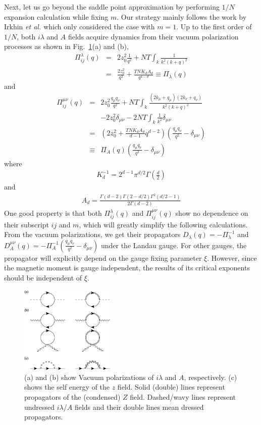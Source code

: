 \documentclass[aps,twocolumn,superscriptaddress]{revtex4-1}
\newcommand{\bea}{\begin{eqnarray}}
\newcommand{\eea}{\end{eqnarray}}
\newcommand{\etal}{\textit{et al.{ }}}
\begin{document}
Next, let us go
beyond the saddle point approximation by performing $1/N$ expansion calculation while fixing $m$. Our strategy mainly follows the work by
Irkhin \etal \cite{irkhin1996} which only considered the case with $m=1$. Up to the first order of $1/N$, both
$i\lambda$ and $A$ fields acquire dynamics from their vacuum polarization processes as shown in Fig.~\ref{fig:self}(a) and (b),
\bea \Pi_{ij}^\lambda(q)&=&2z_0^2\frac{1}{q^2} + NT\int_k \frac{1}{k^2(k+q)^2} \nonumber\\
                        &=&\frac{2z_0^2}{q^2}+\frac{TNK_dA_d}{q^{4-d}} \equiv \Pi_\lambda(q) \eea and \bea
\Pi_{ij}^{\mu\nu}(q) &=& 2z_0^2 \frac{q_\mu q_\nu}{q^2} + NT\int_k \frac{(2k_\mu+q_\mu)(2k_\nu+q_\nu)}{k^2(k+q)^2}
\nonumber\\ && - 2z_0^2 \delta_{\mu\nu} -2NT\int_k \frac{1}{k^2}\delta_{\mu\nu}  \nonumber\\
            &=&\left(2z_0^2+\frac{TNK_dA_d}{d-1} q^{d-2}\right)\left(\frac{q_\mu q_\nu}{q^2}-\delta_{\mu\nu}\right)
\nonumber\\ &\equiv& \Pi_A(q)\left(\frac{q_\mu q_\nu}{q^2}-\delta_{\mu\nu}\right) \eea where \bea
K_d^{-1}=2^{d-1}\pi^{d/2}\Gamma\left(\frac{d}{2}\right) \eea and \bea
A_d=\frac{\Gamma(d-2)\Gamma(2-d/2)\Gamma^2(d/2-1)}{2\Gamma(d-2)} \eea One good property is that both
$\Pi_{ij}^\lambda(q)$ and $\Pi_{ij}^{\mu\nu}(q)$ show no dependence on their subscript $ij$ and $m$, which will greatly
simplify the following calculations. From the vacuum polarizations, we get their propagators
$D_\lambda(q)=-\Pi_\lambda^{-1}$ and $D_A^{\mu\nu}(q)=-\Pi_A^{-1}\left(\frac{q_\mu q_\nu}{q^2}-\delta_{\mu\nu}\right)$
under the Landau gauge. For other gauges, the propagator will explicitly depend on the gauge fixing parameter $\xi$. 
However, since the magnetic moment is gauge independent, the results of its critical exponents should be independent of $\xi$. \cite{kaul2008}

\begin{figure}
\includegraphics[width=0.4\textwidth]{self.eps}
\caption{\label{fig:self} (a) and (b) show Vacuum polarizations of $i\lambda$ and $A$, respectively. (c) shows the self energy of the $z$ field. Solid (double) lines represent propagators of the (condensed) $Z$ field. Dashed/wavy lines represent undressed $i\lambda$/$A$ fields and their double lines mean dressed propagators.}
\end{figure}
\end{document}
